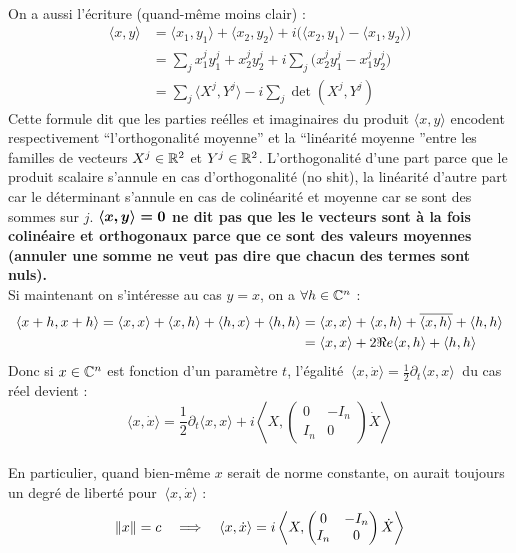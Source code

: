 \\
On a aussi l'écriture (quand-même moins clair) :
\begin{align*}
	\langle x,y \rangle &= \langle x_1, y_1\rangle + \langle x_2, y_2\rangle 
	+ i\big(\langle x_2, y_1\rangle - \langle x_1,y_2\rangle\big) \\
	&= \sum_j x^j_1 y^j_1+ x^j_2 y^j_2+ i\sum_j \big( x^j_2 y^j_1 - x^j_1y^j_2 \big) \\
	&= \sum_j \big\langle X^j,Y^j\big\rangle - i\sum_j \det(X^j, Y^j)
\end{align*}
Cette formule dit que les parties reélles et imaginaires du produit $\langle x,y \rangle$ encodent respectivement ``l'orthogonalité moyenne'' et la ``linéarité moyenne ''entre les familles de vecteurs $X^j\in\R^2$ et $Y^j\in\R^2$. L'orthogonalité d'une part parce que le produit scalaire s'annule en cas d'orthogonalité (no shit), la linéarité d'autre part car le déterminant s'annule en cas de colinéarité et moyenne car se sont des sommes sur $j$. \textbf{$\bf{\langle x,y \rangle=0}$ ne dit pas que les le vecteurs sont à la fois colinéaire et orthogonaux parce que ce sont des valeurs moyennes (\ie annuler une somme ne veut pas dire que chacun des termes sont nuls).}
\\

Si maintenant on s'intéresse au cas $y=x$, on a $\forall h\in\C^n$ :
\begin{align*}
	\langle x+h, x+h \rangle = \langle x, x \rangle + \langle x, h \rangle + \langle h, x \rangle + \langle h, h \rangle 
	&= \langle x, x \rangle + \langle x, h \rangle  + \congu{\langle x, h \rangle }+ \langle h, h \rangle \\
	&= \langle x, x \rangle + 2\Re e \langle x, h \rangle + \langle h, h \rangle
\end{align*}
Donc si $x\in\C^n$ est fonction d'un paramètre $t$, l'égalité $\ \langle x, \dot{x} \rangle = \frac{1}{2}\partial_t\langle x, x \rangle\ $ du cas réel devient :
\[\langle x, \dot{x} \rangle = \frac{1}{2}\partial_t\langle x, x \rangle + i\left\langle X,\begin{pmatrix} 0 & -I_n \\ I_n & 0 \end{pmatrix}\dot{X}\right\rangle\]
\\
En particulier, quand bien-même $x$ serait de norme constante, on aurait toujours un degré de liberté pour $\ \langle x, \dot{x} \rangle$ :
\[\|x\|=c\quad \Lr\quad \langle x, \dot{x} \rangle = i\left\langle X,\begin{pmatrix} 0 & -I_n \\ I_n & 0 \end{pmatrix}\dot{X}\right\rangle\]
\\

